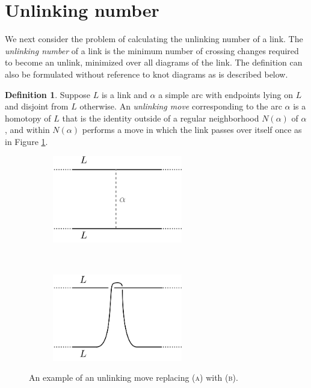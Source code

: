 \documentclass[12pt]{amsart}
\theoremstyle{definition}
\newtheorem{defn}[thm]{Definition}
\theoremstyle{remark}
\begin{document}
\section{Unlinking number}\label{sec_unlinkingnum}

We next consider the problem of calculating the unlinking number of a link.  The \emph{unlinking number} of a link is the minimum number of crossing changes required to become an unlink, minimized over all diagrams of the link.  The definition can also be formulated without reference to knot diagrams as is described below.

\begin{defn}
Suppose $L$ is a link and $\alpha$ a simple arc with endpoints lying on $L$ and disjoint from $L$ otherwise.  An \emph{unlinking move} corresponding to the arc $\alpha$ is a homotopy of $L$ that is the identity outside of a regular neighborhood $N(\alpha)$ of $\alpha$, and within $N(\alpha)$ performs a move in which the link passes over itself once as in Figure \ref{fig_unlinkingmove}.\end{defn}

\begin{figure}[ht]
\centering
    \begin{subfigure}[b]{0.5\textwidth}
        \centering
        \includegraphics[height=1.5in]{unlinkingmove_a.png}
        \caption{}
    \end{subfigure}%
~~~~~
    \begin{subfigure}[b]{0.5\textwidth}
        \centering
        \includegraphics[height=1.5in]{unlinkingmove_b.png}
        \caption{}
    \end{subfigure}

\caption{An example of an unlinking move replacing (\textsc{a}) with (\textsc{b}).}
\label{fig_unlinkingmove}
\end{figure}
\end{document}
